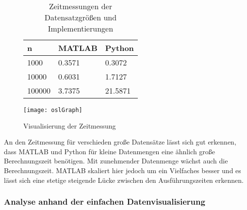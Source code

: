 


\begin{figure}[H]
	\begin{minipage}[b]{.4\linewidth} %
		\begin{table}[H]
			\begin{tabular}{|l|l|l|}
				\hline
				\textbf{n} & \textbf{MATLAB} & \textbf{Python} \\ \hline
				1000       & 0.3571               & 0.3072               \\ \hline
				10000      & 0.6031               & 1.7127               \\ \hline
				100000     & 3.7375               & 21.5871              \\ \hline
			\end{tabular}
			\caption{Zeitmessungen der Datensatzgrößen und Implementierungen}
		\end{table}
	\end{minipage}
	\hspace{.1\linewidth}%
	\begin{minipage}[b]{.4\linewidth} %
		\texttt{[image: oslGraph]}
		\caption{Visualisierung der Zeitmessung}
	\end{minipage}
\end{figure}

An den Zeitmessung für verschieden große Datensätze lässt sich gut erkennen, dass MATLAB und Python für kleine Datenmengen eine ähnlich große Berechnungszeit benötigen. Mit zunehmender Datenmenge wächst auch die Berechnungszeit. MATLAB skaliert hier jedoch um ein Vielfaches besser und es lässt sich eine stetige steigende Lücke zwischen den Ausführungszeiten erkennen.


\subsubsection{Analyse anhand der einfachen Datenvisualisierung}

